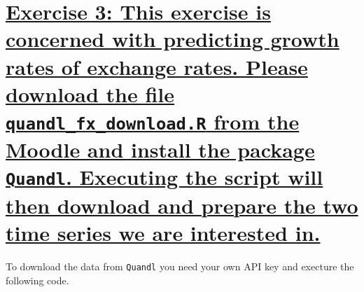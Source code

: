 \documentclass[12pt,a4paper]{article}
\newcommand{\tmpsection}[1]{}
\let\tmpsection=\section
\renewcommand{\section}[1]{\tmpsection{\underline{#1}} }
\begin{document}
\hypertarget{exercise-3-this-exercise-is-concerned-with-predicting-growth-rates-of-exchange-rates.-please-download-the-file-quandl_fx_download.r-from-the-moodle-and-install-the-package-quandl.-executing-the-script-will-then-download-and-prepare-the-two-time-series-we-are-interested-in.}{%
\section{\texorpdfstring{Exercise 3: This exercise is concerned with
predicting growth rates of \n exchange rates. Please download the file
\texttt{quandl\_fx\_download.R} from the Moodle and install the package
\texttt{Quandl}. Executing the script will then download and prepare the
two time series we are interested
in.}{Exercise 3: This exercise is concerned with predicting growth rates of exchange rates. Please download the file quandl\_fx\_download.R from the Moodle and install the package Quandl. Executing the script will then download and prepare the two time series we are interested in.}}\label{exercise-3-this-exercise-is-concerned-with-predicting-growth-rates-of-exchange-rates.-please-download-the-file-quandl_fx_download.r-from-the-moodle-and-install-the-package-quandl.-executing-the-script-will-then-download-and-prepare-the-two-time-series-we-are-interested-in.}}

To download the data from \texttt{Quandl} you need your own API key and
execture the following code.
\end{document}
